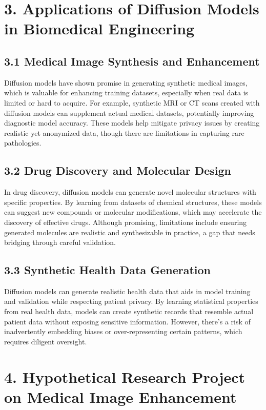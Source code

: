 \documentclass[12pt]{article}
\begin{document}
\section*{3. Applications of Diffusion Models in Biomedical Engineering}

\subsection*{3.1 Medical Image Synthesis and Enhancement}
Diffusion models have shown promise in generating synthetic medical images, which is valuable for enhancing training datasets, especially when real data is limited or hard to acquire. For example, synthetic MRI or CT scans created with diffusion models can supplement actual medical datasets, potentially improving diagnostic model accuracy. These models help mitigate privacy issues by creating realistic yet anonymized data, though there are limitations in capturing rare pathologies.

\subsection*{3.2 Drug Discovery and Molecular Design}
In drug discovery, diffusion models can generate novel molecular structures with specific properties. By learning from datasets of chemical structures, these models can suggest new compounds or molecular modifications, which may accelerate the discovery of effective drugs. Although promising, limitations include ensuring generated molecules are realistic and synthesizable in practice, a gap that needs bridging through careful validation.

\subsection*{3.3 Synthetic Health Data Generation}
Diffusion models can generate realistic health data that aids in model training and validation while respecting patient privacy. By learning statistical properties from real health data, models can create synthetic records that resemble actual patient data without exposing sensitive information. However, there’s a risk of inadvertently embedding biases or over-representing certain patterns, which requires diligent oversight.

\section*{4. Hypothetical Research Project on Medical Image Enhancement}
\end{document}
